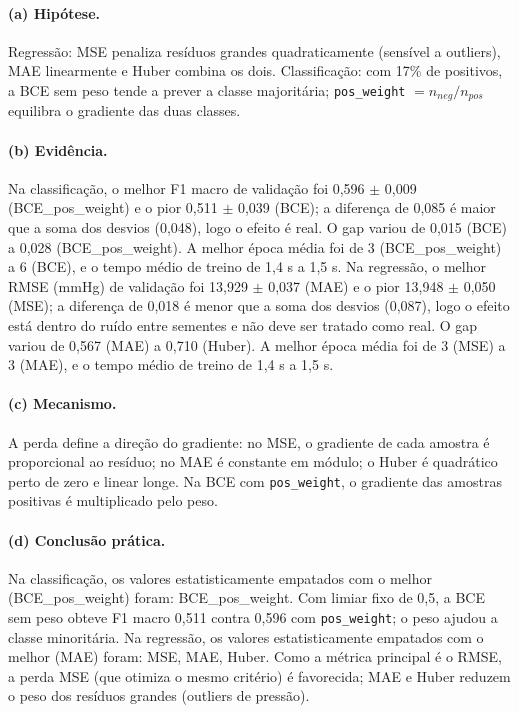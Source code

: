 \documentclass[11pt,a4paper]{article}
\begin{document}
\paragraph{(a) Hipótese.} Regressão: MSE penaliza resíduos grandes quadraticamente (sensível a outliers), MAE linearmente e Huber combina os dois. Classificação: com 17\% de positivos, a BCE sem peso tende a prever a classe majoritária; \texttt{pos\_weight} $= n_{neg}/n_{pos}$ equilibra o gradiente das duas classes.

\paragraph{(b) Evidência.} Na classificação, o melhor F1 macro de validação foi 0,596 $\pm$ 0,009 (BCE\_pos\_weight) e o pior 0,511 $\pm$ 0,039 (BCE); a diferença de 0,085 é maior que a soma dos desvios (0,048), logo o efeito é real. O gap variou de 0,015 (BCE) a 0,028 (BCE\_pos\_weight). A melhor época média foi de 3 (BCE\_pos\_weight) a 6 (BCE), e o tempo médio de treino de 1,4 s a 1,5 s. Na regressão, o melhor RMSE (mmHg) de validação foi 13,929 $\pm$ 0,037 (MAE) e o pior 13,948 $\pm$ 0,050 (MSE); a diferença de 0,018 é menor que a soma dos desvios (0,087), logo o efeito está dentro do ruído entre sementes e não deve ser tratado como real. O gap variou de 0,567 (MAE) a 0,710 (Huber). A melhor época média foi de 3 (MSE) a 3 (MAE), e o tempo médio de treino de 1,4 s a 1,5 s.

\paragraph{(c) Mecanismo.} A perda define a direção do gradiente: no MSE, o gradiente de cada amostra é proporcional ao resíduo; no MAE é constante em módulo; o Huber é quadrático perto de zero e linear longe. Na BCE com \texttt{pos\_weight}, o gradiente das amostras positivas é multiplicado pelo peso.

\paragraph{(d) Conclusão prática.} Na classificação, os valores estatisticamente empatados com o melhor (BCE\_pos\_weight) foram: BCE\_pos\_weight. Com limiar fixo de 0,5, a BCE sem peso obteve F1 macro 0,511 contra 0,596 com \texttt{pos\_weight}; o peso ajudou a classe minoritária. Na regressão, os valores estatisticamente empatados com o melhor (MAE) foram: MSE, MAE, Huber. Como a métrica principal é o RMSE, a perda MSE (que otimiza o mesmo critério) é favorecida; MAE e Huber reduzem o peso dos resíduos grandes (outliers de pressão).
\end{document}
